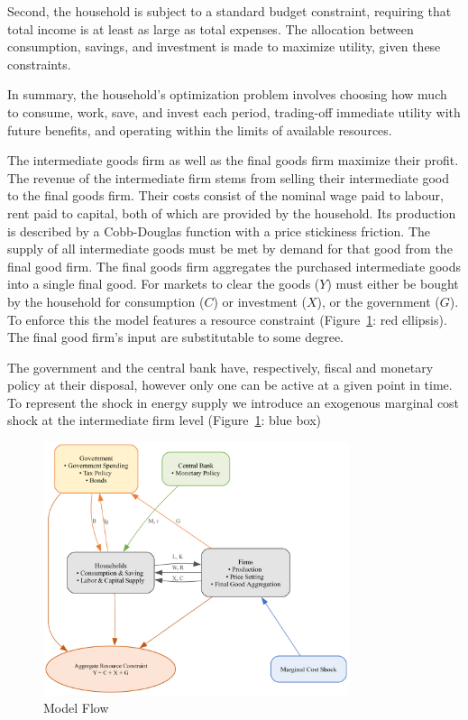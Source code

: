 \documentclass[12pt]{article}
\begin{document}
Second, the household is subject to a standard budget constraint, requiring that total income is at least as large as total expenses. The allocation between consumption, savings, and investment is made to maximize utility, given these constraints.

In summary, the household's optimization problem involves choosing how much to consume, work, save, and invest each period, trading-off immediate utility with future benefits, and operating within the limits of available resources.

The intermediate goods firm as well as the final goods firm maximize their profit. The revenue of the intermediate firm stems from selling their intermediate good to the final goods firm. Their costs consist of the nominal wage paid to labour, rent paid to capital, both of which are provided by the household. Its production is described by a Cobb-Douglas function with a price stickiness friction. The supply of all intermediate goods must be met by demand for that good from the final good firm. The final goods firm aggregates the purchased intermediate goods into a single final good. For markets to clear the goods ($Y$) must either be bought by the household for consumption ($C$) or investment ($X$), or the government ($G$). To enforce this the model features a resource constraint (Figure~\ref{fig:model_flow}: red ellipsis). The final good firm's input are substitutable to some degree. 

The government and the central bank have, respectively, fiscal and monetary policy at their disposal, however only one can be active at a given point in time. To represent the shock in energy supply we introduce an exogenous marginal cost shock at the intermediate firm level (Figure~\ref{fig:model_flow}: blue box)


\begin{figure}[!h]
    \caption{Model Flow}\label{fig:model_flow}
    \centering
    \includegraphics[width=0.8\textwidth]{../../model_graph.png}
\end{figure}
\end{document}
